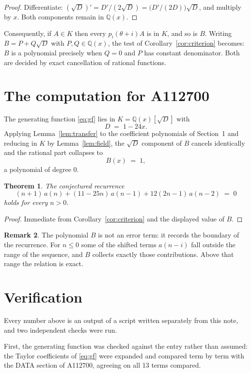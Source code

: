 \documentclass[11pt,a4paper]{article}
\theoremstyle{plain}
\newtheorem{theorem}{Theorem}
\theoremstyle{definition}
\newtheorem{remark}[theorem]{Remark}
\begin{document}
\begin{proof}
Differentiate: $(\sqrt{D})'=D'/(2\sqrt{D})=\bigl(D'/(2D)\bigr)\sqrt{D}$, and multiply by
$x$. Both components remain in $\mathbb{Q}(x)$.
\end{proof}

Consequently, if $A\in K$ then every $p_{i}(\theta+i)A$ is in $K$, and so is $B$. Writing
$B=P+Q\sqrt{D}$ with $P,Q\in\mathbb{Q}(x)$, the test of Corollary~\ref{cor:criterion}
becomes: $B$ is a polynomial precisely when $Q=0$ and $P$ has constant denominator. Both
are decided by exact cancellation of rational functions.

\section{The computation for A112700}

The generating function \eqref{eq:gf} lies in $K=\mathbb{Q}(x)[\sqrt{D}]$ with
\[
D \;=\; 1 - 24 x .
\]
Applying Lemma~\ref{lem:transfer} to the coefficient polynomials of Section~1 and reducing
in $K$ by Lemma~\ref{lem:field}, the $\sqrt{D}$ component of $B$ cancels identically and
the rational part collapses to
\[
B(x)\;=\;1 ,
\]
a polynomial of degree $0$.

\begin{theorem}
The conjectured recurrence
\[
(n + 1)\,a(n) + (11 - 25 n)\,a(n-1) + 12 \left(2 n - 1\right)\,a(n-2) \;=\;0
\]
holds for every $n>0$.
\end{theorem}

\begin{proof}
Immediate from Corollary~\ref{cor:criterion} and the displayed value of $B$.
\end{proof}

\begin{remark}
The polynomial $B$ is not an error term: it records the boundary of the recurrence. For
$n\le0$ some of the shifted terms $a(n-i)$ fall outside the range of the sequence,
and $B$ collects exactly those contributions. Above that range the relation is exact.
\end{remark}

\section{Verification}

Every number above is an output of a script written separately from this note, and two
independent checks were run.

First, the generating function was checked against the entry rather than assumed: the
Taylor coefficients of \eqref{eq:gf} were expanded and compared term by term with the DATA
section of A112700, agreeing on all 13 terms compared.
\end{document}

